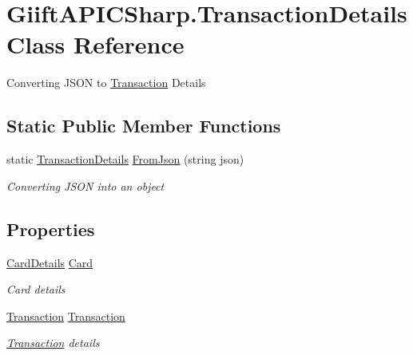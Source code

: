 \hypertarget{class_giift_a_p_i_c_sharp_1_1_transaction_details}{}\section{Giift\+A\+P\+I\+C\+Sharp.\+Transaction\+Details Class Reference}
\label{class_giift_a_p_i_c_sharp_1_1_transaction_details}


Converting J\+S\+ON to \hyperlink{class_giift_a_p_i_c_sharp_1_1_transaction}{Transaction} Details  


\subsection*{Static Public Member Functions}
\begin{DoxyCompactItemize}
\item 
static \hyperlink{class_giift_a_p_i_c_sharp_1_1_transaction_details}{Transaction\+Details} \hyperlink{class_giift_a_p_i_c_sharp_1_1_transaction_details_a58cdd48707822d0f8d43d67942635e5b}{From\+Json} (string json)
\begin{DoxyCompactList}\small\item\em Converting J\+S\+ON into an object \end{DoxyCompactList}\end{DoxyCompactItemize}
\subsection*{Properties}
\begin{DoxyCompactItemize}
\item 
\hyperlink{class_giift_a_p_i_c_sharp_1_1_card_details}{Card\+Details} \hyperlink{class_giift_a_p_i_c_sharp_1_1_transaction_details_aef3030206ce28ab7bf0347a1015fe800}{Card}
\begin{DoxyCompactList}\small\item\em Card details \end{DoxyCompactList}\item 
\hyperlink{class_giift_a_p_i_c_sharp_1_1_transaction}{Transaction} \hyperlink{class_giift_a_p_i_c_sharp_1_1_transaction_details_a3b45e4af0759b309181349c4422e0d17}{Transaction}
\begin{DoxyCompactList}\small\item\em \hyperlink{class_giift_a_p_i_c_sharp_1_1_transaction}{Transaction} details \end{DoxyCompactList}\end{DoxyCompactItemize}


